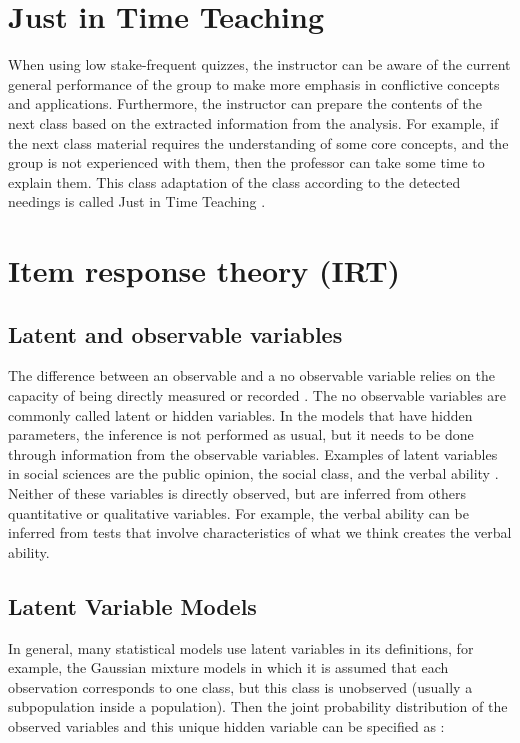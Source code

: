 \section{Just in Time Teaching}

When using low stake-frequent quizzes, the instructor can be aware of the current general performance of the group to make more emphasis in conflictive concepts and applications. Furthermore, the instructor can prepare the contents of the next class based on the extracted information from the analysis. For example, if the next class material requires the understanding of some core concepts, and the group is not experienced with them, then the professor can take some time to explain them. This class adaptation of the class according to the detected needings is called Just in Time Teaching \cite{jitt}.

\section{Item response theory (IRT)}

\subsection{Latent and observable variables}

The difference between an observable and a no observable variable relies on the capacity of being directly measured or recorded \cite{everett2013introduction}. The no observable variables are commonly called latent or hidden variables. In the models that have hidden parameters, the inference is not performed as usual, but it needs to be done through information from the observable variables. Examples of latent variables in social sciences are the public opinion, the social class, and the verbal ability \cite{everett2013introduction}. Neither of these variables is directly observed, but are inferred from others quantitative or qualitative variables. For example, the verbal ability can be inferred from tests that involve characteristics of what we think creates the verbal ability.

\subsection{Latent Variable Models}

In general, many statistical models use latent variables in its definitions, for example, the Gaussian mixture models \cite{bishop2006pattern} in which it is assumed that each observation corresponds to one class, but this class is unobserved (usually a subpopulation inside a population). Then the joint probability distribution of the observed variables and this unique hidden variable can be specified as \cite{bishop2006pattern}:

